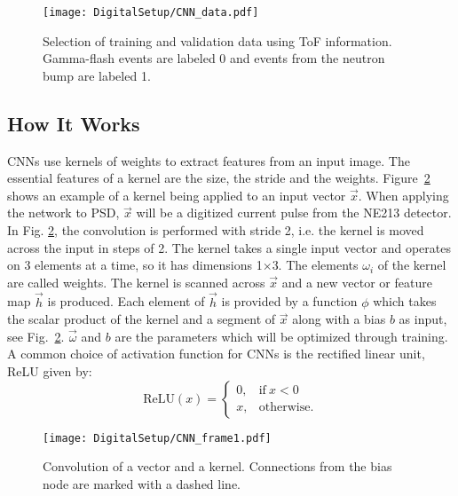 \documentclass[main.tex]{subfiles}
\begin{document}
\begin{figure}[h!]
    \centering
        \texttt{[image: DigitalSetup/CNN\_data.pdf]}
        \caption[Selection of training and validation data using ToF information.]{Selection of training and validation data using ToF information. Gamma-flash events are labeled 0 and events from the neutron bump are labeled 1.}
    \label{fig:CNN_data} 
\end{figure}

\subsection{How It Works}
CNNs use kernels of weights to extract features from an input image. The essential features of a kernel are the size, the stride and the weights. Figure~\ref{fig:CNN_frame1} shows an example of a kernel being applied to an input vector $\vec{x}$. When applying the network to PSD, $\vec{x}$ will be a digitized current pulse from the NE213 detector. In Fig. \ref{fig:CNN_frame1}, the convolution is performed with stride 2, i.e. the kernel is moved across the input in steps of 2. 
The kernel takes a single input vector and operates on 3 elements at a time, so it has dimensions 1$\times$3. The elements $\omega_i$ of the kernel are called weights. The kernel is scanned across $\vec{x}$ and a new vector or feature map $\vec{h}$ is produced. Each element of $\vec{h}$ is provided by a function $\phi$ which takes the scalar product of the kernel and a segment of $\vec{x}$ along with a bias $b$ as input, see Fig.~\ref{fig:CNN_frame1}. $\vec{\omega}$ and $b$ are the parameters which will be optimized through training.
A common choice of activation function for CNNs is the rectified linear unit, ReLU given by:
\begin{equation}
	\textrm{ReLU}(x) = 
	\begin{cases}
    	0, & \text{if}\ x<0 \\
    	x, & \text{otherwise}.
    \end{cases}
\end{equation}


\begin{figure}[h!]
    \centering
        \texttt{[image: DigitalSetup/CNN\_frame1.pdf]}
        \caption[Convolution of a vector and a kernel.]{Convolution of a vector and a kernel. Connections from the bias node are marked with a dashed line.}
    \label{fig:CNN_frame1} 
\end{figure}
\end{document}
